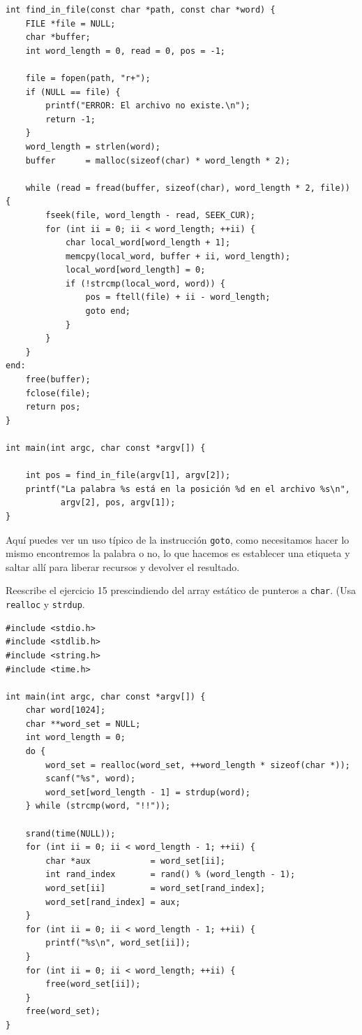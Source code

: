 \documentclass[a4paper]{article}
\begin{document}
\begin{exercises}
\begin{minipage}[H]{\linewidth}
\begin{lstlisting}[style=C,
caption={Solución al ejercicio 17},
label={lst:solution17}]
int find_in_file(const char *path, const char *word) {
    FILE *file = NULL;
    char *buffer;
    int word_length = 0, read = 0, pos = -1;

    file = fopen(path, "r+");
    if (NULL == file) {
        printf("ERROR: El archivo no existe.\n");
        return -1;
    }
    word_length = strlen(word);
    buffer      = malloc(sizeof(char) * word_length * 2);

    while (read = fread(buffer, sizeof(char), word_length * 2, file)) {
        fseek(file, word_length - read, SEEK_CUR);
        for (int ii = 0; ii < word_length; ++ii) {
            char local_word[word_length + 1];
            memcpy(local_word, buffer + ii, word_length);
            local_word[word_length] = 0;
            if (!strcmp(local_word, word)) {
                pos = ftell(file) + ii - word_length;
                goto end;
            }
        }
    }
end:
    free(buffer);
    fclose(file);
    return pos;
}

int main(int argc, char const *argv[]) {

    int pos = find_in_file(argv[1], argv[2]);
    printf("La palabra %s está en la posición %d en el archivo %s\n",
           argv[2], pos, argv[1]);
}
\end{lstlisting}
\end{minipage}

Aquí puedes ver un uso típico de la instrucción \verb!goto!, como necesitamos
hacer lo mismo encontremos la palabra o no, lo que hacemos es establecer
una etiqueta y saltar allí para liberar recursos y devolver el resultado.

\item Reescribe el ejercicio 15 prescindiendo del array estático de punteros
a \verb!char!. (Usa \verb!realloc! y \verb!strdup!.

\noindent
\begin{minipage}[H]{\linewidth}
\mbox{}
\begin{lstlisting}[style=C,
caption={Solución al ejercicio 18},
label={lst:solution18}]
#include <stdio.h>
#include <stdlib.h>
#include <string.h>
#include <time.h>

int main(int argc, char const *argv[]) {
    char word[1024];
    char **word_set = NULL;
    int word_length = 0;
    do {
        word_set = realloc(word_set, ++word_length * sizeof(char *));
        scanf("%s", word);
        word_set[word_length - 1] = strdup(word);
    } while (strcmp(word, "!!"));

    srand(time(NULL));
    for (int ii = 0; ii < word_length - 1; ++ii) {
        char *aux            = word_set[ii];
        int rand_index       = rand() % (word_length - 1);
        word_set[ii]         = word_set[rand_index];
        word_set[rand_index] = aux;
    }
    for (int ii = 0; ii < word_length - 1; ++ii) {
        printf("%s\n", word_set[ii]);
    }
    for (int ii = 0; ii < word_length; ++ii) {
        free(word_set[ii]);
    }
    free(word_set);
}
\end{lstlisting}
\end{minipage}



\end{exercises}
\end{document}
